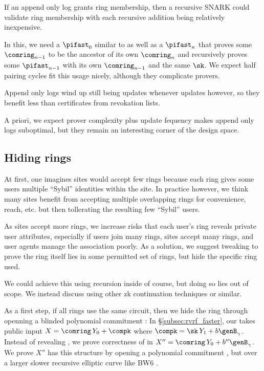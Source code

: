 If an append only log grants ring membership, then a recursive SNARK
could validate ring membership with each recursive addition being
relatively inexpensive.

In this, we need a $\pifast_0$ similar to \pifast as well as a
$\pifast_n$ that proves some $\comring_{n-1}$ to be the ancestor of
its own $\comring_n$ and recursively proves some $\pifast_{n-1}$ with
its own $\comring_{n-1}$ and the same $\sk$.
We expect half pairing cycles fit this usage nicely, although they complicate provers.

Append only logs wind up still being updates whenever \ctx updates
however, so they benefit less than certificates from revokation lists.

A priori, we expect prover complexity plus update fequency makes
append only logs suboptimal, but
 they remain an interesting corner of the design space.

\subsection{Hiding rings} %
\label{subsec:hiding_rings}

At first, one imagines sites would accept few rings because each ring
gives some users multiple ``Sybil'' identities within the site.
In practice however, we think many sites benefit from accepting
multiple overlapping rings for convenience, reach, etc. but then
tollerating the resulting few ``Sybil'' users.

As sites accept more rings, we increase risks that each user's ring
\ctx reveals private user attributes, especially if
 users join many rings, sites accept many rings, and
 user agents manage the association poorly.
As a solution, we suggest tweaking \pifast to prove the ring itself
lies in some permitted set of rings, but hide the specific ring used.

We could achieve this using recursion inside \pifast of course,
but doing so lies out of scope.  We instead discuss using other
zk continuation techniques or similar.

As a first step, if all rings use the same circuit, then we hide the
ring through openning a blinded polynomial commitment \cite{KZG}: 
In \S\ref{subsec:rvrf_faster}, our \pifast takes public input
 $X = \comring\, Y_0 + \compk$ where $\compk = \sk\, Y_1 + b \genB_\gamma$.
Instead of revealing \comring, we prove correctness of \comring in
 $X'' = \comring\, Y_0 + b'' \genB_\gamma$.
We prove $X''$ has this structure by opening a polynomial commitment
\cite{KZG}, but over a larger slower recursive elliptic curve
 like BW6 \cite{BW6}.

